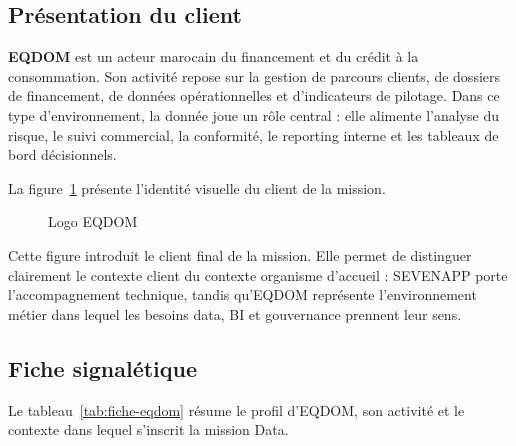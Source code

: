 \subsection{Présentation du client}

\textbf{EQDOM} est un acteur marocain du financement et du crédit à la consommation. Son activité repose sur la gestion de parcours clients, de dossiers de financement, de données opérationnelles et d'indicateurs de pilotage. Dans ce type d'environnement, la donnée joue un rôle central : elle alimente l'analyse du risque, le suivi commercial, la conformité, le reporting interne et les tableaux de bord décisionnels.

La figure~\ref{fig:eqdom-logo} présente l'identité visuelle du client de la mission.

\begin{figure}[H]
\centering
{}
\caption{Logo EQDOM}
\label{fig:eqdom-logo}
\end{figure}

Cette figure introduit le client final de la mission. Elle permet de distinguer clairement le contexte client du contexte organisme d'accueil : SEVENAPP porte l'accompagnement technique, tandis qu'EQDOM représente l'environnement métier dans lequel les besoins data, BI et gouvernance prennent leur sens.

\subsection{Fiche signalétique}

Le tableau~\ref{tab:fiche-eqdom} résume le profil d'EQDOM, son activité et le contexte dans lequel s'inscrit la mission Data.

